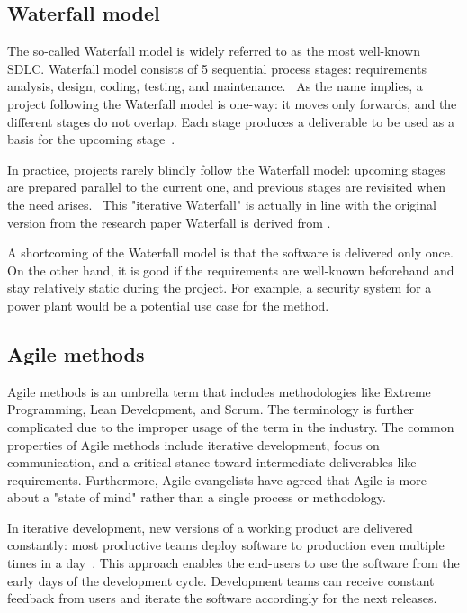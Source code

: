 \subsection{Waterfall model}

The so-called Waterfall model is widely referred to as the most well-known SDLC. Waterfall model consists of 5 sequential process stages: requirements analysis, design, coding, testing, and maintenance.~\cite{alshamrani_comparison_2015} As the name implies, a project following the Waterfall model is one-way: it moves only forwards, and the different stages do not overlap. Each stage produces a deliverable to be used as a basis for the upcoming stage~\cite{balaji_waterfall_2012}. 

In practice, projects rarely blindly follow the Waterfall model: upcoming stages are prepared parallel to the current one, and previous stages are revisited when the need arises.~\cite{sommerville_software_2016} This "iterative Waterfall" is actually in line with the original version from the research paper Waterfall is derived from \cite{royce_managing_nodate}.

A shortcoming of the Waterfall model is that the software is delivered only once. On the other hand, it is good if the requirements are well-known beforehand and stay relatively static during the project. For example, a security system for a power plant would be a potential use case for the method.

\subsection{Agile methods}

Agile methods is an umbrella term that includes methodologies like Extreme Programming, Lean Development, and Scrum. The terminology is further complicated due to the improper usage of the term in the industry. The common properties of Agile methods include iterative development, focus on communication, and a critical stance toward intermediate deliverables like requirements. Furthermore, Agile evangelists have agreed that Agile is more about a "state of mind" rather than a single process or methodology.~\cite{cohen_introduction_2004}

In iterative development, new versions of a working product are delivered constantly: most productive teams deploy software to production even multiple times in a day~\cite{forsgren_accelerate_2018}. This approach enables the end-users to use the software from the early days of the development cycle. Development teams can receive constant feedback from users and iterate the software accordingly for the next releases.~\cite{balaji_waterfall_2012}

